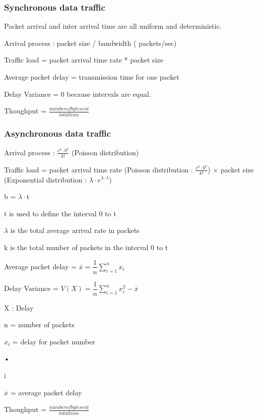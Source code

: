 \subsubsection{Synchronous data traffic}
Packet arrival and inter arrival time are all uniform and deterministic.
\begin{description}
    \item Arrival process : packet size / bandwidth ( packets/sec)
    \item Traffic load = packet arrival time rate * packet size
    \item Average packet delay = transmission time for one packet
    \item Delay Variance = 0 because intervals are equal.
    \item Thoughput = $\frac{number of byte sent}{total time}$
\end{description}

\subsubsection{Asynchronous data traffic}

\begin{description}
    \item Arrival process : $ \frac{e^{b} \cdot b^{k}}{k!}$ (Poisson distribution)
    \item Traffic load = packet arrival time rate  (Poisson distribution : $ \frac{e^{b} \cdot b^{k}}{k!}$) $\times$ packet size (Exponential distribution : $\lambda \cdot e^{ \lambda \cdot t}$)
	\begin{description}  
    \item b = $\lambda \cdot$t
    \item t is used to define the interval 0 to t   
    \item $\lambda$ is the total average arrival rate in packets
   	\item k is the total number of packets in the interval 0 to t
   	\end{description}
    \item Average packet delay = $\overline{x} = \dfrac{1}{n} \sum_{i=1}^{n} x_{i}$
    \item Delay Variance = $ V(X) = \dfrac{1}{n} \sum_{i=1}^{n} x_{i}^{2} - \overline{x}$
    	\begin{description}
    	\item X : Delay
    	\item n = number of packets
    	\item $x_{i}$ = delay for packet number \begin{tiny}
•
\end{tiny}i
    	\item $\overline{x}$ = average packet delay
       	\end{description}
    \item Thoughput = $\frac{number of byte sent}{total time}$
\end{description}

